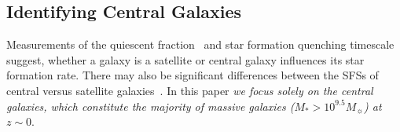 \documentclass[tighten, preprint]{aastex62}
\begin{document}
\subsection{Identifying Central Galaxies} \label{sec:central}
Measurements of the quiescent fraction~\citep[\emph{e.g.}][]{baldry2006,peng2010,hahn2015}
and star formation quenching timescale~\citep{wetzel2013,hahn2017b} 
suggest, whether a galaxy is a satellite or central galaxy influences 
its star formation rate. There may also be significant differences 
between the SFSs of central versus satellite galaxies~\citep{wang2018}. 
In this paper \emph{we focus solely on the central galaxies, which 
constitute the majority of massive galaxies ($M_* > 10^{9.5}M_\sun$) at $z \sim 0$}. 
\end{document}
